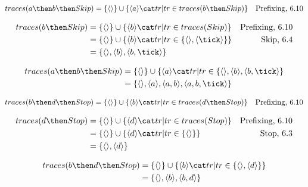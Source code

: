 \documentclass{scrreprt}
\begin{document}
\begin{align*}
  traces(a \then b \then Skip) &= \{ \langle \rangle \} \cup \{ \langle a \rangle \cat tr | tr \in traces(b \then Skip) \} & \text{Prefixing, 6.10}
\end{align*}

\begin{align*}
  traces(b \then Skip) &= \{ \langle \rangle \} \cup \{ \langle b \rangle \cat tr | tr \in traces(Skip) \} & \text{Prefixing, 6.10} \\
                       &= \{ \langle \rangle \} \cup \{ \langle b \rangle \cat tr | tr \in \{ \langle \rangle, \langle \tick \rangle \} \} & \text{Skip, 6.4} \\
                       &= \{ \langle \rangle, \langle b \rangle, \langle b, \tick \rangle \}
\end{align*}

\begin{align*}
  traces(a \then b \then Skip) &= \{ \langle \rangle \} \cup \{ \langle a \rangle \cat tr | tr \in \{ \langle \rangle, \langle b \rangle, \langle b, \tick \rangle \} \\
                               &= \{ \langle \rangle, \langle a \rangle, \langle a, b \rangle, \langle a, b, \tick \rangle \}
\end{align*}

\begin{align*}
  traces(b \then d \then Stop) &= \{ \langle \rangle \} \cup \{ \langle b \rangle \cat tr | tr \in traces(d \then Stop) \} & \text{Prefixing, 6.10}
\end{align*}

\begin{align*}
  traces(d \then Stop) &= \{ \langle \rangle \} \cup \{ \langle d \rangle \cat tr | tr \in traces(Stop) \} & \text{Prefixing, 6.10} \\
                       &= \{ \langle \rangle \} \cup \{ \langle d \rangle \cat tr | tr \in \{ \langle \rangle \} \} & \text{Stop, 6.3} \\
                       &= \{ \langle \rangle, \langle d \rangle \}
\end{align*}

\begin{align*}
  traces(b \then d \then Stop) &= \{ \langle \rangle \} \cup \{ \langle b \rangle \cat tr | tr \in \{ \langle \rangle, \langle d \rangle \} \} \\
                               &= \{ \langle \rangle, \langle b \rangle, \langle b, d \rangle \}
\end{align*}
\end{document}
